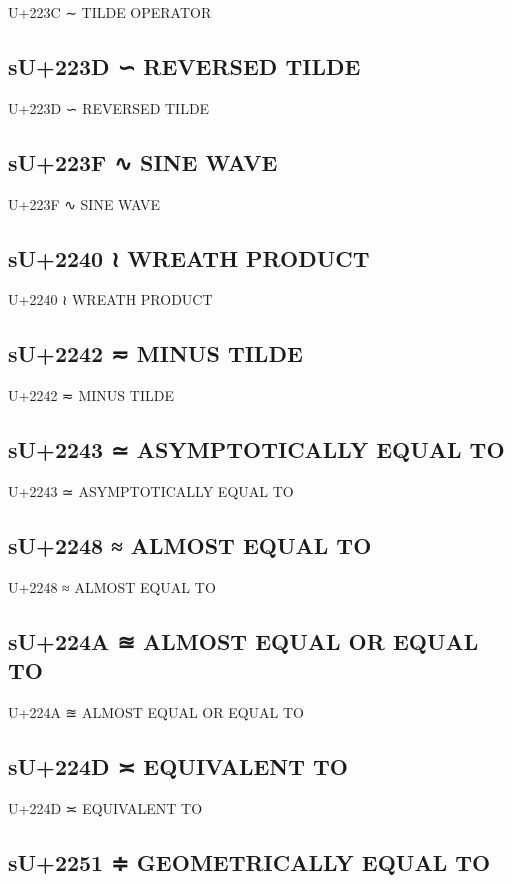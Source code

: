 U+223C ∼ TILDE OPERATOR

\subsection{sU+223D ∽ REVERSED TILDE}

U+223D ∽ REVERSED TILDE

\subsection{sU+223F ∿ SINE WAVE}

U+223F ∿ SINE WAVE

\subsection{sU+2240 ≀ WREATH PRODUCT}

U+2240 ≀ WREATH PRODUCT

\subsection{sU+2242 ≂ MINUS TILDE}

U+2242 ≂ MINUS TILDE

\subsection{sU+2243 ≃ ASYMPTOTICALLY EQUAL TO}

U+2243 ≃ ASYMPTOTICALLY EQUAL TO

\subsection{sU+2248 ≈ ALMOST EQUAL TO}

U+2248 ≈ ALMOST EQUAL TO

\subsection{sU+224A ≊ ALMOST EQUAL OR EQUAL TO}

U+224A ≊ ALMOST EQUAL OR EQUAL TO

\subsection{sU+224D ≍ EQUIVALENT TO}

U+224D ≍ EQUIVALENT TO

\subsection{sU+2251 ≑ GEOMETRICALLY EQUAL TO}

